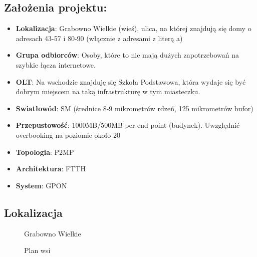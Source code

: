 \subsection{Założenia projektu:}
\begin{itemize}
	\item \textbf{Lokalizacja}: Grabowno Wielkie (wieś), ulica, na której znajdują się domy o adresach 43-57 i 80-90 (włącznie z adresami z literą a)
	\item \textbf{Grupa odbiorców}: Osoby, które to nie mają dużych zapotrzebowań na szybkie łącza internetowe.
	\item \textbf{OLT}: Na wschodzie znajduję się Szkoła Podstawowa, która wydaje się być dobrym miejscem na taką infrastrukturę w tym miasteczku.
	\item \textbf{Swiatłowód}: SM (średnice 8-9 mikrometrów rdzeń, 125 mikrometrów bufor)
	\item \textbf{Przepustowość}: 1000MB/500MB per end point (budynek). Uwzględnić overbooking na poziomie około 20%
	\item \textbf{Topologia}: P2MP
	\item \textbf{Architektura}: FTTH
	\item \textbf{System}: GPON
\end{itemize}

\newpage
\subsection{Lokalizacja}

	\begin{center}
		\begin{figure}[h!]
			\caption{Grabowno Wielkie}
			\label{fig:grabowno_intro}
		\end{figure}
		\begin{figure}[h!]
			\caption{Plan wsi}
			\label{fig:plan_intro}
		\end{figure}
	\end{center}

